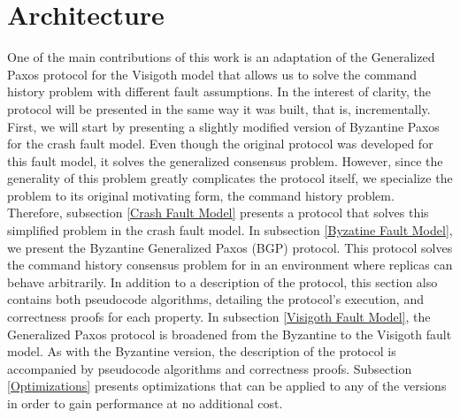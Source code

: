 \chapter{Architecture}

One of the  main contributions of this work is an adaptation of the Generalized Paxos protocol for the Visigoth model that allows us to solve the command history problem with different fault assumptions. In the interest of clarity, the protocol will be presented in the same way it was built, that is, incrementally. First, we will start by presenting a slightly modified version of Byzantine Paxos for the crash fault model. Even though the original protocol was developed for this fault model, it solves the generalized consensus problem. However, since the generality of this problem greatly complicates the protocol itself, we specialize the problem to its original motivating form, the command history problem. Therefore, subsection \ref{Crash Fault Model} presents a protocol that solves this simplified problem in the crash fault model. In subsection \ref{Byzatine Fault Model}, we present the Byzantine Generalized Paxos (BGP) protocol. This protocol solves the command history consensus problem for in an environment where replicas can behave arbitrarily. In addition to a description of the protocol, this section also contains both pseudocode algorithms, detailing the protocol's execution, and correctness proofs for each property. In subsection \ref{Visigoth Fault Model}, the Generalized Paxos protocol is broadened from the Byzantine to the Visigoth fault model. As with the Byzantine version, the description of the protocol is accompanied by pseudocode algorithms and correctness proofs. Subsection \ref{Optimizations} presents optimizations that can be applied to any of the versions in order to gain performance at no additional cost.



\clearpage


\clearpage


\clearpage


%
